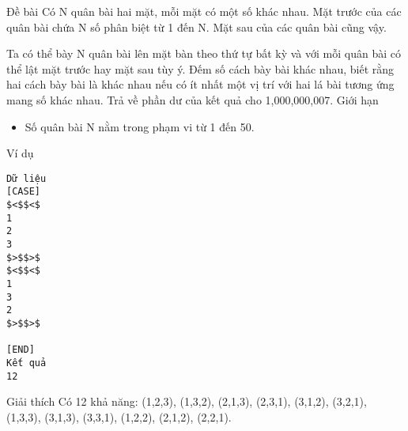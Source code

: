 Đề bài
Có N quân bài hai mặt, mỗi mặt có một số khác nhau. Mặt trước của các quân bài chứa N số phân biệt từ 1 đến N. Mặt sau của các quân bài cũng vậy.  

   Ta có thể bày N quân bài lên mặt bàn theo thứ tự bất kỳ và với mỗi quân bài có thể lật mặt trước hay mặt sau tùy ý. Đếm số cách bày bài khác nhau, biết rằng hai cách bày bài là khác nhau nếu có ít nhất một vị trí với hai lá bài tương ứng mang số khác nhau. Trả về phần dư của kết quả cho 1,000,000,007.
Giới hạn
\begin{itemize}
	\item     Số quân bài N nằm trong phạm vi từ 1 đến 50.   
\end{itemize}
Ví dụ
\begin{verbatim}
Dữ liệu
[CASE]
$<$$<$
1
2 
3
$>$$>$
$<$$<$
1 
3
2
$>$$>$

[END]
Kết quả
12
\end{verbatim}
Giải thích
Có 12 khả năng: (1,2,3), (1,3,2), (2,1,3), (2,3,1), (3,1,2), (3,2,1), (1,3,3), (3,1,3), (3,3,1), (1,2,2), (2,1,2), (2,2,1).